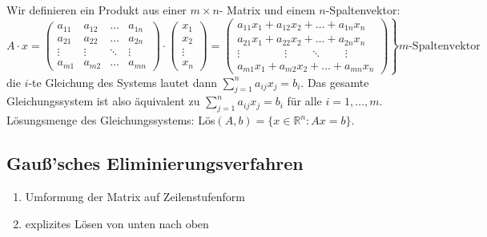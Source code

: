 \documentclass[12pt,a4paper]{article}
\theoremstyle{plain}
\newcommand{\R}{\mathbb{R}}
\numberwithin{equation}{section}
\begin{document}
Wir definieren ein Produkt aus einer $m\times n$- Matrix und einem $n$-Spaltenvektor:\[
A\cdot x =\left. \left(\begin{matrix}
a_{11} & a_{12} & \ldots & a_{1n} \\
a_{21} & a_{22} & \ldots & a_{2n} \\
\vdots & \vdots & \ddots & \vdots \\
a_{m1} & a_{m2} & \ldots & a_{mn} 
\end{matrix} \right) \cdot \left(\begin{array}{c}x_1\\ x_2\\  \vdots\\x_n\end{array}\right) = \left(\begin{matrix}
a_{11}x_1+a_{12}x_2+\ldots+a_{1n}x_n  \\ 
a_{21}x_1+a_{22}x_2+\ldots+a_{2n}x_n \\ 
\vdots\qquad \qquad \vdots \qquad \ddots \qquad  \vdots\\ 
a_{m1}x_1+a_{m2}x_2+\ldots+a_{mn}x_n \end{matrix} \right) \right\rbrace m\text{-Spaltenvektor} 
\]
die $i$-te Gleichung des Systems lautet dann $\sum_{j=1}^n{a_{ij}x_j}=b_i$. Das gesamte Gleichungssystem ist also äquivalent zu $\sum_{j=1}^n{a_{ij}x_j}=b_i$ für alle $i=1,\ldots,m$. \\
Lösungsmenge des Gleichungssystems: Lös$(A,b)=\{x\in\R^n: Ax=b\}$.
\subsection{Gauß'sches Eliminierungsverfahren}
\begin{enumerate}
\item Umformung der Matrix auf Zeilenstufenform
\item explizites Lösen \glqq von unten nach oben\grqq
\end{enumerate}
\end{document}

